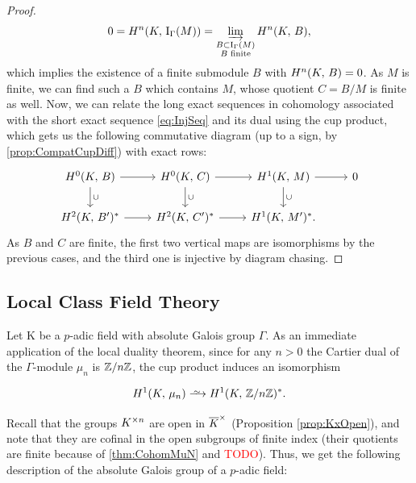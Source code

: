 \documentclass[a4paper, oneside]{memoir}
\begin{document}
\begin{proof}
    \[
        0=H^{n}( K, \, \mathrm{I}_{\Gamma}(M) )=\varinjlim_{\substack{B\subset\mathrm{I}_{\Gamma}(M) \\B\text{ finite}}}{H^{n}( K, \, B )},
    \]
    which implies the existence of a finite submodule \(B\) with \(H^{n}( K, \, B )=0\). As \(M\) is finite, we can find such a \(B\) which contains \(M\), whose quotient \(C=B/M\) is finite as well.
    Now, we can relate the long exact sequences in cohomology associated with the short exact sequence \eqref{eq:InjSeq}
    and its dual using the cup product, which gets us the following commutative diagram (up to a sign, by \ref{prop:CompatCupDiff}) with exact rows:
    \[
        \begin{tikzcd}
            \H{0}{\K}{B} \ar[r] \ar[d, "\cup"] & \H{0}{\K}{C} \ar[r] \ar[d, "\cup"] & \H{1}{\K}{M} \ar[d, "\cup"] \ar[r] & 0 \\
            \H{2}{\K}{B^\prime}^* \ar[r] & \H{2}{\K}{C^\prime}^* \ar[r] & \H{1}{\K}{M^\prime}^*.
        \end{tikzcd}
    \]
    As \(B\) and \(C\) are finite, the first two vertical maps are isomorphisms by the previous cases, and the third one is injective by diagram chasing.

\end{proof}


\subsection{Local Class Field Theory}

Let K be a $p$-adic field with absolute Galois group $\Gamma$. As an immediate application of the local duality theorem, since for any $n>0$ the Cartier dual of the $\Gamma$-module $\mu_n$ is $\mathbb{Z}/n\mathbb{Z}$, the cup product induces an isomorphism


\[
    \H{1}{K}{\mu_n} \Iso \H{1}{K}{\Zn}^*.
\]

Recall that the groups $K^{\times n}$ are open in $\overline{K}^\times$ (Proposition \ref{prop:KxOpen}), and note that they are cofinal in the open subgroups of finite index (their quotients are
finite because of \ref{thm:CohomMuN} and \textcolor{red}{TODO}). Thus, we get the following description of the absolute Galois group of a $p$-adic field:

\end{document}
